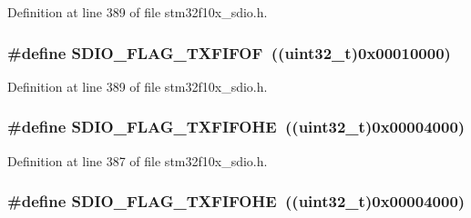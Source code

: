 Definition at line 389 of file stm32f10x\+\_\+sdio.\+h.

\subsubsection[{\texorpdfstring{S\+D\+I\+O\+\_\+\+F\+L\+A\+G\+\_\+\+T\+X\+F\+I\+F\+OF}{SDIO_FLAG_TXFIFOF}}]{\setlength{\rightskip}{0pt plus 5cm}\#define S\+D\+I\+O\+\_\+\+F\+L\+A\+G\+\_\+\+T\+X\+F\+I\+F\+OF~(({\bf uint32\+\_\+t})0x00010000)}\hypertarget{group___s_d_i_o___flags_gad3ca936300ef251639a4cfbe2f63b6b8}{}\label{group___s_d_i_o___flags_gad3ca936300ef251639a4cfbe2f63b6b8}


Definition at line 389 of file stm32f10x\+\_\+sdio.\+h.

\subsubsection[{\texorpdfstring{S\+D\+I\+O\+\_\+\+F\+L\+A\+G\+\_\+\+T\+X\+F\+I\+F\+O\+HE}{SDIO_FLAG_TXFIFOHE}}]{\setlength{\rightskip}{0pt plus 5cm}\#define S\+D\+I\+O\+\_\+\+F\+L\+A\+G\+\_\+\+T\+X\+F\+I\+F\+O\+HE~(({\bf uint32\+\_\+t})0x00004000)}\hypertarget{group___s_d_i_o___flags_gae9277461d3c8984dc31af318e2df1959}{}\label{group___s_d_i_o___flags_gae9277461d3c8984dc31af318e2df1959}


Definition at line 387 of file stm32f10x\+\_\+sdio.\+h.

\subsubsection[{\texorpdfstring{S\+D\+I\+O\+\_\+\+F\+L\+A\+G\+\_\+\+T\+X\+F\+I\+F\+O\+HE}{SDIO_FLAG_TXFIFOHE}}]{\setlength{\rightskip}{0pt plus 5cm}\#define S\+D\+I\+O\+\_\+\+F\+L\+A\+G\+\_\+\+T\+X\+F\+I\+F\+O\+HE~(({\bf uint32\+\_\+t})0x00004000)}\hypertarget{group___s_d_i_o___flags_gae9277461d3c8984dc31af318e2df1959}{}\label{group___s_d_i_o___flags_gae9277461d3c8984dc31af318e2df1959}


